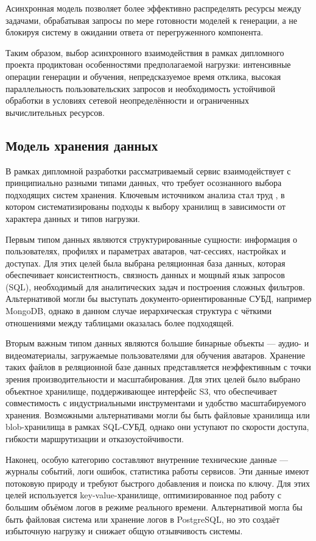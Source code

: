 Асинхронная модель позволяет более эффективно
распределять ресурсы между задачами,
обрабатывая запросы по мере готовности моделей к генерации,
а не блокируя систему в ожидании ответа от перегруженного компонента.

Таким образом, выбор асинхронного взаимодействия
в рамках дипломного проекта продиктован особенностями предполагаемой нагрузки:
интенсивные операции генерации и обучения,
непредсказуемое время отклика,
высокая параллельность пользовательских запросов
и необходимость устойчивой обработки в условиях
сетевой неопределённости и ограниченных вычислительных ресурсов.

\subsection{Модель хранения данных}
В рамках дипломной разработки рассматриваемый сервис
взаимодействует с принципиально разными типами данных,
что требует осознанного выбора подходящих систем хранения.
Ключевым источником анализа стал труд \cite{DataIntenciveDesign},
в котором систематизированы подходы к выбору хранилищ
в зависимости от характера данных и типов нагрузки.

Первым типом данных являются структурированные сущности:
информация о пользователях, профилях и параметрах аватаров,
чат-сессиях, настройках и доступах.
Для этих целей была выбрана реляционная база данных,
которая обеспечивает консистентность, связность данных
и мощный язык запросов (SQL), необходимый для аналитических задач
и построения сложных фильтров.
Альтернативой могли бы выступать документо-ориентированные СУБД,
например MongoDB, однако в данном случае
иерархическая структура с чёткими отношениями между таблицами
оказалась более подходящей.

Вторым важным типом данных являются
большие бинарные объекты — аудио- и видеоматериалы,
загружаемые пользователями для обучения аватаров.
Хранение таких файлов в реляционной базе данных
представляется неэффективным с точки зрения производительности и масштабирования.
Для этих целей было выбрано объектное хранилище,
поддерживающее интерфейс S3,
что обеспечивает совместимость с индустриальными инструментами
и удобство масштабируемого хранения.
Возможными альтернативами могли бы быть файловые хранилища
или blob-хранилища в рамках SQL-СУБД,
однако они уступают по скорости доступа,
гибкости маршрутизации и отказоустойчивости.

Наконец, особую категорию составляют
внутренние технические данные — журналы событий, логи ошибок,
статистика работы сервисов.
Эти данные имеют потоковую природу
и требуют быстрого добавления и поиска по ключу.
Для этих целей используется key-value-хранилище,
оптимизированное под работу с большим объёмом логов в режиме реального времени.
Альтернативой могла бы быть файловая система
или хранение логов в PostgreSQL,
но это создаёт избыточную нагрузку и снижает общую отзывчивость системы.

